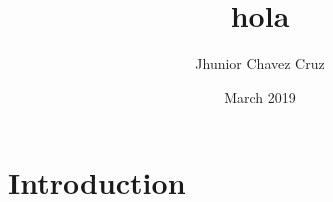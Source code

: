 \documentclass{article}
\title{hola}
\author{Jhunior Chavez Cruz}
\date{March 2019}
\begin{document}
\maketitle

\section{Introduction}
\end{document}
